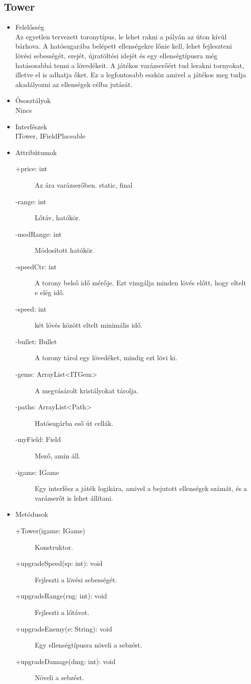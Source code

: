\subsection{Tower}
\begin{itemize}
\item Felelősség\\
Az egyetlen tervezett toronytípus, le lehet rakni a pályán az úton kívül bárhova. A hatósugarába belépett ellenségekre lőnie kell, lehet fejleszteni lövési sebességét, erejét, újratöltési idejét és egy ellenségtípusra még hatásosabbá tenni a lövedékeit. A játékos varázserőért tud lerakni tornyokat, illetve el is adhatja őket. Ez a legfontosabb eszköz amivel a játékos meg tudja akadályozni az ellenségek célba jutását.
\item Ősosztályok\\
Nincs
\item Interfészek\\
ITower, IFieldPlaceable
\item Attribútumok
	\begin{description}
		\item[+price: int] Az ára varázserőben. static, final
\item[-range: int] Lőtáv, hatókör.
\item[-modRange: int] Módosított hatókör. 
\item[-speedCtr: int] A torony belső idő mérője. Ezt vizsgálja minden lövés előtt, hogy eltelt e elég idő. 
\item[-speed: int] két lövés között eltelt minimális idő. 
\item[-bullet: Bullet] A torony tárol egy lövedéket, mindig ezt lövi ki. 
\item[-gems: ArrayList<ITGem> ] A megvásárolt kristályokat tárolja.  
\item[-paths: ArrayList<Path>] Hatósugárba eső út cellák.   
\item[-myField: Field] Mező, amin áll. 
\item[-igame: IGame] Egy interfész a játék logikára, amivel a bejutott ellenségek számát, és a varázserőt is lehet állítani.  

	\end{description}
\item Metódusok
	\begin{description}
		\item[+Tower(igame: IGame)] Konstruktor. 
\item[+upgradeSpeed(sp: int): void] Fejleszti a lövési sebességét. 
\item[+upgradeRange(rng: int): void] Fejleszti a lőtávot. 
\item[+upgradeEnemy(e: String): void] Egy ellenségtípusra növeli a sebzést. 
\item[+upgradeDamage(dmg: int): void] Növeli a sebzést. 

		
		
	\end{description}
\end{itemize}

